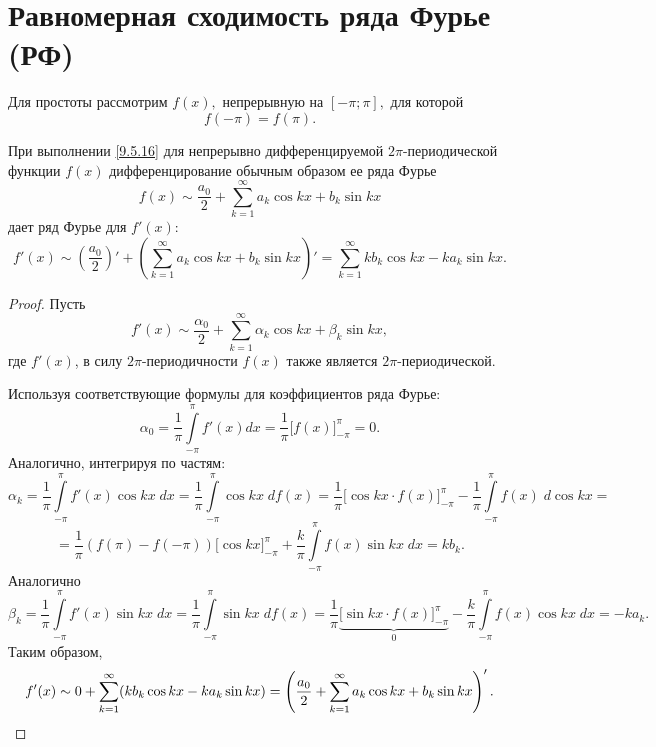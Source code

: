 \documentclass[../../main.tex]{subfiles}
\begin{document}
\section{Равномерная сходимость ряда Фурье (РФ)}
	Для простоты рассмотрим $f(x),$ непрерывную на $[-\pi; \pi],$ для которой 
	\begin{equation}\label{9.5.16}
	f(-\pi) = f(\pi).
	\end{equation}
	\begin{thm}
		При выполнении \eqref{9.5.16} для непрерывно дифференцируемой 
		$2\pi$-периодической функции $f(x)$ дифференцирование обычным образом ее 
		ряда 
		Фурье
		\[
		f(x) \sim \frac{a_0}{2} + \sum_{k=1}^{\infty}  a_k \cos k x +
		b_k \sin k x
		\]
		дает ряд Фурье для $f'(x):$
		\begin{equation} \label{9.5.17}
			f'(x) \sim \left(\frac{a_0}{2}\right)' + \left(\sum_{k=1}^{\infty}  a_k 
			\cos k x +
			b_k \sin k x\right)' = \sum_{k=1}^{\infty} k b_k \cos k x - k
			a_k \sin k x.
		\end{equation}
	\end{thm}
	\begin{proof}
		Пусть
		\[
			f'(x) \sim \frac{\alpha_0}{2} + \sum_{k=1}^{\infty}  \alpha_k \cos k x +
			\beta_k \sin k x,
		\]
		где $f'(x)$, в силу $2\pi$-периодичности $f(x)$ также является 
		$2\pi$-периодической.
		
		Используя соответствующие формулы для коэффициентов ряда Фурье:
		\[
			\alpha_0 = \frac{1}{\pi} \int\limits_{-\pi}^{\pi} f'(x) dx = \frac{1}{\pi} 
			\big[f(x)\big]_{-\pi}^{\pi} = 0.
		\]
		Аналогично, интегрируя по частям:
		\[
			\alpha_k = \frac{1}{\pi} \int\limits_{-\pi}^{\pi} f'(x) \cos kx\; dx = 
			\frac{1}{\pi} 
			\int\limits_{-\pi}^{\pi} \cos kx\; df(x)  = \frac{1}{\pi} \big[\cos kx
			\cdot f(x)\big]_{-\pi}^{\pi} -
			\frac{1}{\pi} \int\limits_{-\pi}^{\pi} f(x)\;d \cos kx = 
			\]
			\[ =
			\frac{1}{\pi} (f(\pi) - f(-\pi)) \big[\cos kx\big]_{-\pi}^{\pi} +
			\frac{k}{\pi} \int\limits_{-\pi}^{\pi} f(x)\sin kx\;dx = k b_k.
		\]
		Аналогично
		\[
			\beta_k = \frac{1}{\pi} \int\limits_{-\pi}^{\pi} f'(x) \sin kx\;dx
			= \frac{1}{\pi} \int\limits_{-\pi}^{\pi} \sin kx\;df(x)  =
			\frac{1}{\pi} \underbrace{\big[\sin kx \cdot f(x)\big]_{-\pi}^{\pi}}_{0} -
			\frac{k}{\pi} \int\limits_{-\pi}^{\pi} f(x) \cos kx\;dx = -ka_k.
		\]
		Таким образом, 
		\[
		f'(x) \sim 0 + \sum_{k=1}^{\infty}( k b_k \cos k x - k
		a_k \sin k x) = \left(\frac{a_0}{2} + \sum_{k=1}^{\infty}  a_k \cos k x +
		b_k \sin k x\right)'.
		\qedhere
		\]
	\end{proof}
\end{document}
